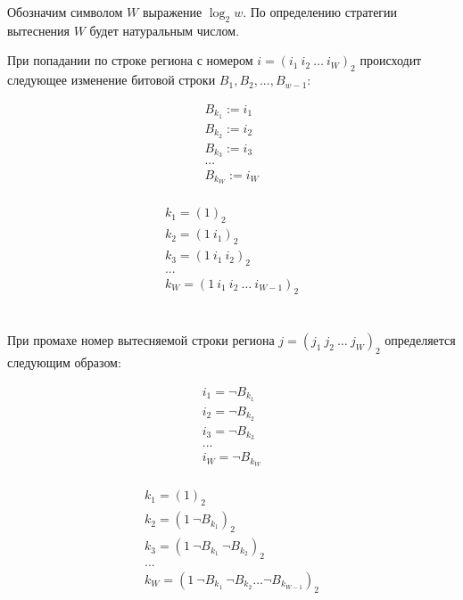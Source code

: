 \begin{enumerate}
Обозначим символом $W$ выражение $\log_2 w$. По определению
стратегии вытеснения \PseudoLRU $W$ будет натуральным числом.

\begin{utv}\label{wMinus1PseudoLRU}При попадании по строке региона с номером $i = (i_1~i_2~\dots~i_W)_2$ происходит следующее изменение битовой строки $B_1,
B_2, ..., B_{w{-}1}$:

\parbox{0.3\textwidth}{
  $$ \begin{array}{l}
  B_{k_1} := i_1 \\
  B_{k_2} := i_2 \\
  B_{k_3} := i_3 \\
  ...\\
  B_{k_W} := i_W \\
  \end{array}$$
} \vline
\parbox{0.7\textwidth}{
  $$ \begin{array}{l}
  k_1 = (1)_2 \\
  k_2 = (1~i_1)_2 \\
  k_3 = (1~i_1~i_2)_2 \\
  ...\\
  k_W = (1~i_1~i_2~\dots~i_{W{-}1})_2 \\
  \end{array} $$
}
\\[1cm]

При промахе номер вытесняемой строки региона $j = (j_1~j_2~\dots~j_W)_2$ определяется следующим образом:

\parbox{0.3\textwidth}{
  $$ \begin{array}{l}
  i_1 = \neg B_{k_1} \\
  i_2 = \neg B_{k_2} \\
  i_3 = \neg B_{k_3} \\
  ...\\
  i_W = \neg B_{k_W} \\
  \end{array}$$
} \vline
\parbox{0.7\textwidth}{
  $$ \begin{array}{l}
  k_1 = (1)_2 \\
  k_2 = (1~\neg B_{k_1})_2 \\
  k_3 = (1~\neg B_{k_1}~\neg B_{k_2})_2 \\
  ...\\
  k_W = (1~\neg B_{k_1}~\neg B_{k_2}\dots\neg B_{k_{W{-}1}})_2 \\
  \end{array} $$
}
\\[0.5cm]


\end{utv}
\end{enumerate}
